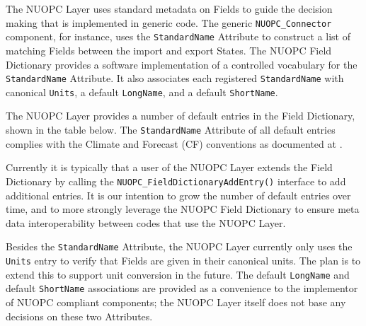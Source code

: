 %
The NUOPC Layer uses standard metadata on Fields to guide the decision making that is implemented in generic code. The generic {\tt NUOPC\_Connector} component, for instance, uses the {\tt StandardName} Attribute to construct a list of matching Fields between the import and export States. The NUOPC Field Dictionary provides a software implementation of a controlled vocabulary for the {\tt StandardName} Attribute. It also associates each registered {\tt StandardName} with canonical {\tt Units}, a default {\tt LongName}, and a default {\tt ShortName}.

The NUOPC Layer provides a number of default entries in the Field Dictionary, shown in the table below. The {\tt StandardName} Attribute of all default entries complies with the Climate and Forecast (CF) conventions as documented at . 

Currently it is typically that a user of the NUOPC Layer extends the Field Dictionary by calling the {\tt  NUOPC\_FieldDictionaryAddEntry()} interface to add additional entries. It is our intention to grow the number of default entries over time, and to more strongly leverage the NUOPC Field Dictionary to ensure meta data interoperability between codes that use the NUOPC Layer.

Besides the {\tt StandardName} Attribute, the NUOPC Layer currently only uses the {\tt Units} entry to verify that Fields are given in their canonical units. The plan is to extend this to support unit conversion in the future. The default {\tt LongName} and default {\tt ShortName} associations are provided as a convenience to the implementor of NUOPC compliant components; the NUOPC Layer itself does not base any decisions on these two Attributes.
